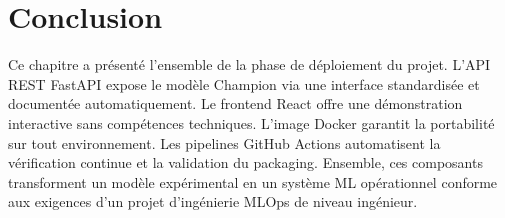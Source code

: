 \documentclass{rapportENSIAS}
\begin{document}
\section{Conclusion}

Ce chapitre a présenté l'ensemble de la phase de déploiement du projet.
L'API REST FastAPI expose le modèle Champion via une interface standardisée
et documentée automatiquement. Le frontend React offre une démonstration
interactive sans compétences techniques. L'image Docker garantit la portabilité
sur tout environnement. Les pipelines GitHub Actions automatisent la
vérification continue et la validation du packaging. Ensemble, ces composants
transforment un modèle expérimental en un système ML opérationnel conforme
aux exigences d'un projet d'ingénierie MLOps de niveau ingénieur.



\end{document}
